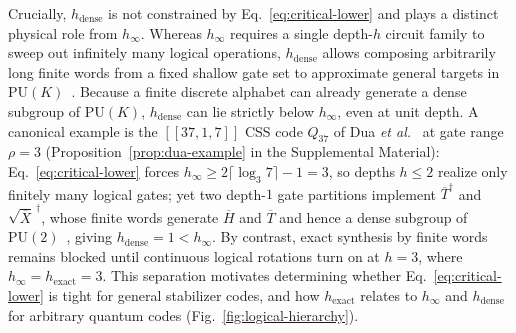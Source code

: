 \documentclass[aps,prl,reprint,notitlepage,nofootinbib,nobibnotes]{revtex4-2}
\newcommand{\PU}{\mathrm{PU}}
\begin{document}
Crucially, \(h_{\mathrm{dense}}\) is not constrained by Eq.~\eqref{eq:critical-lower} and plays a distinct physical role from \(h_\infty\). Whereas \(h_\infty\) requires a single depth-\(h\) circuit family to sweep out infinitely many logical operations, \(h_{\mathrm{dense}}\) allows composing arbitrarily long finite words from a fixed shallow gate set to approximate general targets in \(\PU(K)\)~\cite{Boykin,ZhuLavasaniBarkeshli}. Because a finite discrete alphabet can already generate a dense subgroup of \(\PU(K)\), \(h_{\mathrm{dense}}\) can lie strictly below \(h_\infty\), even at unit depth. A canonical example is the \([[37,1,7]]\) CSS code \(Q_{37}\) of Dua \emph{et al.}~\cite{Dua} at gate range \(\rho=3\) (Proposition~\ref{prop:dua-example} in the Supplemental Material): Eq.~\eqref{eq:critical-lower} forces \(h_\infty\ge 2\lceil\log_3 7\rceil-1=3\), so depths \(h\le2\) realize only finitely many logical gates; yet two depth-\(1\) gate partitions implement \(\overline T^\dagger\) and \(\sqrt{\overline X}^{\,\dagger}\), whose finite words generate \(\overline H\) and \(\overline T\) and hence a dense subgroup of \(\PU(2)\)~\cite{Boykin}, giving \(h_{\mathrm{dense}}=1<h_\infty\). By contrast, exact synthesis by finite words remains blocked until continuous logical rotations turn on at \(h=3\), where \(h_\infty=h_{\mathrm{exact}}=3\). This separation motivates determining whether Eq.~\eqref{eq:critical-lower} is tight for general stabilizer codes, and how \(h_{\mathrm{exact}}\) relates to \(h_\infty\) and \(h_{\mathrm{dense}}\) for arbitrary quantum codes (Fig.~\ref{fig:logical-hierarchy}).
\end{document}
